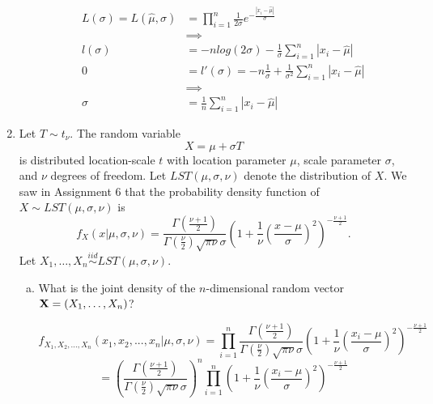\documentclass[letterpaper,12pt,fleqn]{article}
\begin{document}
\begin{enumerate}
\begin{enumerate}[(a)]
\begin{align*}
L(\sigma) = L(\hat{\mu}, \sigma) &= \prod_{i=1}^{n} \frac{1}{2\sigma} e^{-\frac{|x_i -\hat{\mu}|}{\sigma}}\\
& \implies \\
l(\sigma) &= -nlog(2\sigma) - \frac{1}{\sigma}\sum_{i=1}^{n} |x_i - \hat{\mu}|\\
0&= l'(\sigma) = -n\frac{1}{\sigma} + \frac{1}{\sigma^2}\sum_{i=1}^{n} |x_i - \hat{\mu}| \\
& \implies \\
\sigma &= \frac{1}{n} \sum_{i=1}^{n} |x_i - \hat{\mu}|
\end{align*}
\end{enumerate}


\vspace{3em}

\item Let $T \sim t_{\nu}$.  The random variable
\begin{equation*}
X = \mu + \sigma T
\end{equation*}
is distributed location-scale $t$ with location parameter $\mu$, scale parameter $\sigma$, and $\nu$ degrees of freedom.  Let $LST(\mu, \sigma, \nu)$ denote the distribution of $X$.  We saw in Assignment 6 that the probability density function of $X \sim LST(\mu, \sigma, \nu)$ is
\begin{equation*}
f_{X}(x | \mu, \sigma, \nu) = \frac{\Gamma \left( \frac{\nu + 1}{2} \right)}{\Gamma \left( \frac{\nu}{2} \right) \sqrt{\pi \nu} \sigma} \left( 1 + \frac{1}{\nu} \left( \frac{x - \mu}{\sigma} \right)^{2} \right)^{-\frac{\nu + 1}{2}}.
\end{equation*}
Let $X_{1}, \ldots, X_{n} \overset{iid}{\sim} LST(\mu, \sigma, \nu)$.

\begin{enumerate}[a)]
\item What is the joint density of the $n$-dimensional random vector ${\bf X} = (X_{1}, \ldots, X_{n})$?

$$f_{X_1,X_2,...,X_n}(x_1,x_2,...,x_n | \mu, \sigma, \nu) = 
\prod_{i=1}^{n} \frac{\Gamma \left( \frac{\nu + 1}{2} \right)}{\Gamma \left( \frac{\nu}{2} \right) \sqrt{\pi \nu} \sigma} \left( 1 + \frac{1}{\nu} \left( \frac{x_i - \mu}{\sigma} \right)^{2} \right)^{-\frac{\nu + 1}{2}}$$$$=\left(\frac{\Gamma \left( \frac{\nu + 1}{2} \right)}{\Gamma \left( \frac{\nu}{2} \right) \sqrt{\pi \nu} \sigma}\right)^n\prod_{i=1}^{n} \left( 1 + \frac{1}{\nu} \left( \frac{x_i - \mu}{\sigma} \right)^{2} \right)^{-\frac{\nu + 1}{2}}$$


\end{enumerate}
\end{enumerate}
\end{document}

